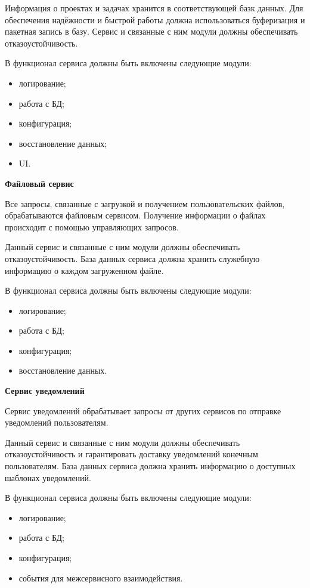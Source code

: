 Информация о проектах и задачах хранится в соответствующей базк данных. Для обеспечения надёжности и быстрой работы должна использоваться буферизация и пакетная запись в базу. Сервис и связанные с ним модули должны обеспечивать отказоустойчивость.

В функционал сервиса должны быть включены следующие модули:
\begin{itemize}
    \item логирование;
    \item работа с БД;
    \item конфигурация;
    \item восстановление данных;
    \item UI.
\end{itemize}

\bigskip
\textbf{Файловый сервис}

Все запросы, связанные с загрузкой и получением пользовательских файлов, обрабатываются файловым сервисом. Получение информации о файлах происходит с помощью управляющих запросов.

Данный сервис и связанные с ним модули должны обеспечивать отказоустойчивость. База данных сервиса должна хранить служебную информацию о каждом загруженном файле.

В функционал сервиса должны быть включены следующие модули:
\begin{itemize}
    \item логирование;
    \item работа с БД;
    \item конфигурация;
    \item восстановление данных.
\end{itemize}

\bigskip
\textbf{Сервис уведомлений}

Сервис уведомлений обрабатывает запросы от других сервисов по отправке уведомлений пользователям.

Данный сервис и связанные с ним модули должны обеспечивать отказоустойчивость и гарантировать доставку уведомлений конечным пользователям. База данных сервиса должна хранить информацию о доступных шаблонах уведомлений.

В функционал сервиса должны быть включены следующие модули:
\begin{itemize}
    \item логирование;
    \item работа с БД;
    \item конфигурация;
    \item события для межсервисного взаимодействия.
\end{itemize}

